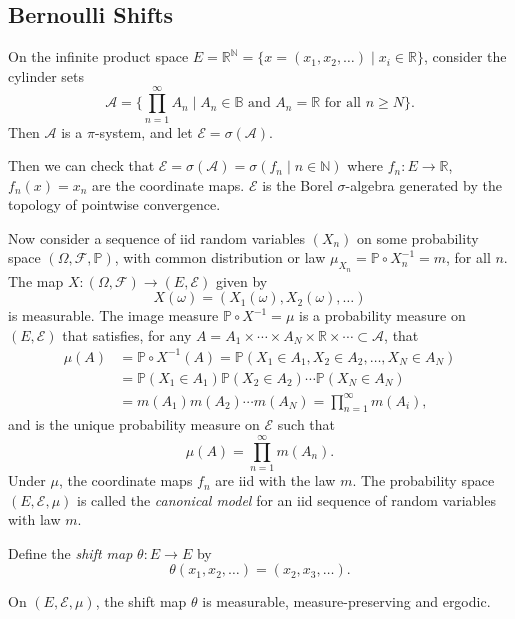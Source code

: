 \documentclass[12pt]{article}
\begin{document}
\subsection{Bernoulli Shifts}
\label{sub:ber_shift}

On the infinite product space $E = \mathbb{R}^{\mathbb{N}} = \{x = (x_1, x_2, \ldots ) \mid x_i \in \mathbb{R}\}$, consider the cylinder sets
\[
	\mathcal{A} = \biggl\{ \prod_{n = 1}^{\infty} A_n \mid A_n \in \mathbb{B} \text{ and } A_n = \mathbb{R} \text{ for all } n \geq N \biggr\}.
\]
Then $\mathcal{A}$ is a $\pi$-system, and let $\mathcal{E} = \sigma(\mathcal{A})$.

Then we can check that $\mathcal{E} = \sigma(\mathcal{A}) = \sigma(f_n \mid n \in \mathbb{N})$ where $f_n : E \to \mathbb{R}$, $f_n(x) = x_n$ are the coordinate maps. $\mathcal{E}$ is the Borel $\sigma$-algebra generated by the topology of pointwise convergence.

Now consider a sequence of iid random variables $(X_n)$ on some probability space $(\Omega, \mathcal{F}, \mathbb{P})$, with common distribution or law $\mu_{X_n} = \mathbb{P} \circ X_n^{-1} = m$, for all $n$. The map $X : (\Omega, \mathcal{F}) \to (E, \mathcal{E})$ given by
\[
X(\omega) = (X_1(\omega), X_2(\omega), \ldots)
\]
is measurable. The image measure $\mathbb{P} \circ X^{-1} = \mu$ is a probability measure on $(E, \mathcal{E})$ that satisfies, for any $A = A_1 \times \cdots \times A_N \times \mathbb{R} \times \cdots \subset \mathcal{A}$, that
\begin{align*}
	\mu(A) &= \mathbb{P} \circ X^{-1}(A) = \mathbb{P}(X_1 \in A_1, X_2 \in A_2, \ldots, X_N \in A_N) \\
	       &= \mathbb{P}(X_1 \in A_1) \mathbb{P}(X_2 \in A_2) \cdots \mathbb{P}(X_N \in A_N) \\
	       &= m(A_1)m(A_2) \cdots m(A_N) = \prod_{n = 1}^{\infty} m(A_i),
\end{align*}
and is the unique probability measure on $\mathcal{E}$ such that
\[
\mu(A) = \prod_{n = 1}^{\infty} m(A_n).
\]
Under $\mu$, the coordinate maps $f_n$ are iid with the law $m$. The probability space $(E, \mathcal{E}, \mu)$ is called the \emph{canonical model} for an iid sequence of random variables with law $m$.

Define the \emph{shift map} $\theta : E \to E$ by
\[
\theta(x_1, x_2, \ldots) = (x_2, x_3, \ldots).
\]

\begin{theorem}
	On $(E, \mathcal{E}, \mu)$, the shift map $\theta$ is measurable, measure-preserving and ergodic.
\end{theorem}
\end{document}
